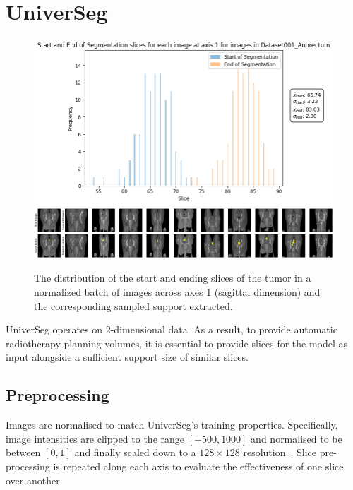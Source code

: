 \documentclass[11pt,twoside]{report}
\begin{document}
\section{UniverSeg}

\begin{figure}
  \centering
  \includegraphics[width=.8\linewidth]{../../research/source/code/UniverSeg/start_end_distribution_axis_1_anorectum.png}
  \includegraphics[width=\linewidth, trim=0 0 340px 0, clip]{../../research/source/code/UniverSeg/support_anorectum_axis_1.png}
  \caption{The distribution of the start and ending slices of the tumor in a normalized batch of images across axes 1 (sagittal dimension) and the corresponding sampled support extracted.}\label{fig:start-end-distribution-universeg}
\end{figure}

UniverSeg operates on 2-dimensional data. As a result, to provide automatic radiotherapy planning volumes, it is essential to provide slices for the model as input alongside a sufficient support size of similar slices. 

\subsection{Preprocessing}

Images are normalised to match UniverSeg's training properties. Specifically, image intensities are clipped to the range $[-500, 1000]$ and normalised to be between $[0,1]$ and finally scaled down to a $128 \times 128$ resolution~\cite{universeg}. Slice pre-processing is repeated along each axis to evaluate the effectiveness of one slice over another. 
\end{document}
